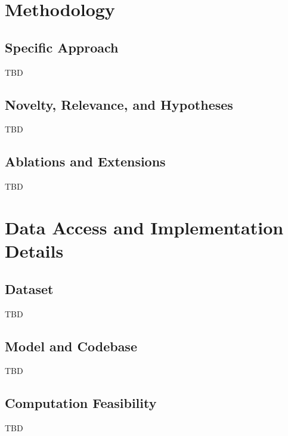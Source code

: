 \documentclass[letterpaper]{article} %
\begin{document}
\section{Methodology}

\subsection{Specific Approach}

TBD

\subsection{Novelty, Relevance, and Hypotheses}

TBD

\subsection{Ablations and Extensions}
\label{sec:ablations-and-extensions}

TBD

\section{Data Access and Implementation Details}

\subsection{Dataset}

TBD

\subsection{Model and Codebase}

TBD

\subsection{Computation Feasibility}
\label{sec:computation-feasibility}

TBD


\end{document}
